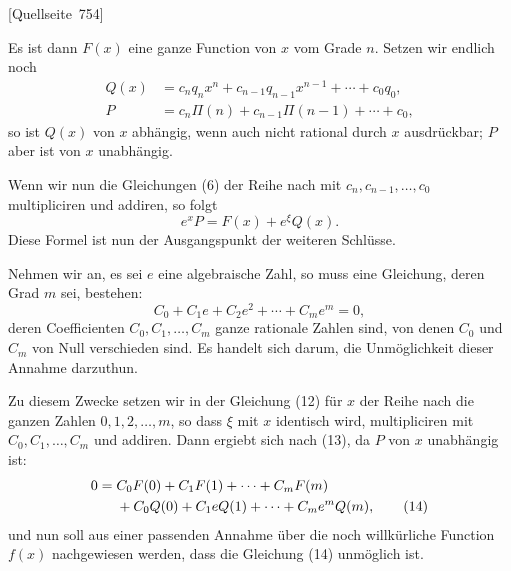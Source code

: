 \documentclass[11pt]{article}
\newcommand{\srcpage}[1]{\par\medskip\noindent\textsf{[Quellseite~#1]}\par\smallskip}
\begin{document}
\srcpage{754}
Es ist dann $F(x)$ eine ganze Function von $x$ vom Grade $n$. Setzen wir endlich noch
\begin{align}
Q(x)&=c_nq_nx^n+c_{n-1}q_{n-1}x^{n-1}+\cdots+c_0q_0,\tag{10}\\
P&=c_n\Pi(n)+c_{n-1}\Pi(n-1)+\cdots+c_0,\tag{11}
\end{align}
so ist $Q(x)$ von $x$ abhängig, wenn auch nicht rational durch $x$ ausdrückbar; $P$ aber ist von $x$ unabhängig.

Wenn wir nun die Gleichungen (6) der Reihe nach mit $c_n,c_{n-1},\ldots,c_0$ multipliciren und addiren, so folgt
\begin{equation}\tag{12}
e^xP=F(x)+e^\xi Q(x).
\end{equation}
Diese Formel ist nun der Ausgangspunkt der weiteren Schlüsse.

Nehmen wir an, es sei $e$ eine algebraische Zahl, so muss eine Gleichung, deren Grad $m$ sei, bestehen:
\begin{equation}\tag{13}
C_0+C_1e+C_2e^2+\cdots+C_me^m=0,
\end{equation}
deren Coefficienten $C_0,C_1,\ldots,C_m$ ganze rationale Zahlen sind, von denen $C_0$ und $C_m$ von Null verschieden sind. Es handelt sich darum, die Unmöglichkeit dieser Annahme darzuthun.

Zu diesem Zwecke setzen wir in der Gleichung (12) für $x$ der Reihe nach die ganzen Zahlen $0,1,2,\ldots,m$, so dass $\xi$ mit $x$ identisch wird, multipliciren mit $C_0,C_1,\ldots,C_m$ und addiren. Dann ergiebt sich nach (13), da $P$ von $x$ unabhängig ist:
\begin{align}
0={}&C_0F(0)+C_1F(1)+\cdots+C_mF(m)\notag\\
&+C_0Q(0)+C_1eQ(1)+\cdots+C_me^mQ(m),\tag{14}
\end{align}
und nun soll aus einer passenden Annahme über die noch willkürliche Function $f(x)$ nachgewiesen werden, dass die Gleichung (14) unmöglich ist.
\end{document}

